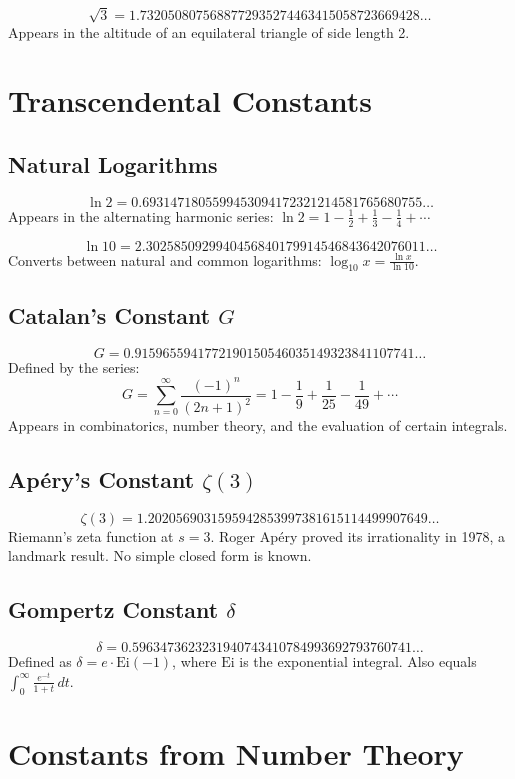 \[
\sqrt{3} = 1.7320508075688772935274463415058723669428\dots
\]
Appears in the altitude of an equilateral triangle of side length 2.

\section{Transcendental Constants}

\subsection{Natural Logarithms}
\[
\ln 2 = 0.6931471805599453094172321214581765680755\dots
\]
Appears in the alternating harmonic series: $\ln 2 = 1 - \frac{1}{2} + \frac{1}{3} - \frac{1}{4} + \cdots$

\[
\ln 10 = 2.3025850929940456840179914546843642076011\dots
\]
Converts between natural and common logarithms: $\log_{10} x = \frac{\ln x}{\ln 10}$.

\subsection{Catalan's Constant $G$}
\[
G = 0.9159655941772190150546035149323841107741\dots
\]
Defined by the series:
\[
G = \sum_{n=0}^{\infty}\frac{(-1)^n}{(2n+1)^2} = 1 - \frac{1}{9} + \frac{1}{25} - \frac{1}{49} + \cdots
\]
Appears in combinatorics, number theory, and the evaluation of certain integrals.

\subsection{Apéry's Constant $\zeta(3)$}
\[
\zeta(3) = 1.2020569031595942853997381615114499907649\dots
\]
Riemann's zeta function at $s=3$. Roger Apéry proved its irrationality in 1978, a landmark result. No simple closed form is known.

\subsection{Gompertz Constant $\delta$}
\[
\delta = 0.5963473623231940743410784993692793760741\dots
\]
Defined as $\delta = e \cdot \text{Ei}(-1)$, where $\text{Ei}$ is the exponential integral. Also equals $\int_0^{\infty}\frac{e^{-t}}{1+t}\,dt$.

\section{Constants from Number Theory}

